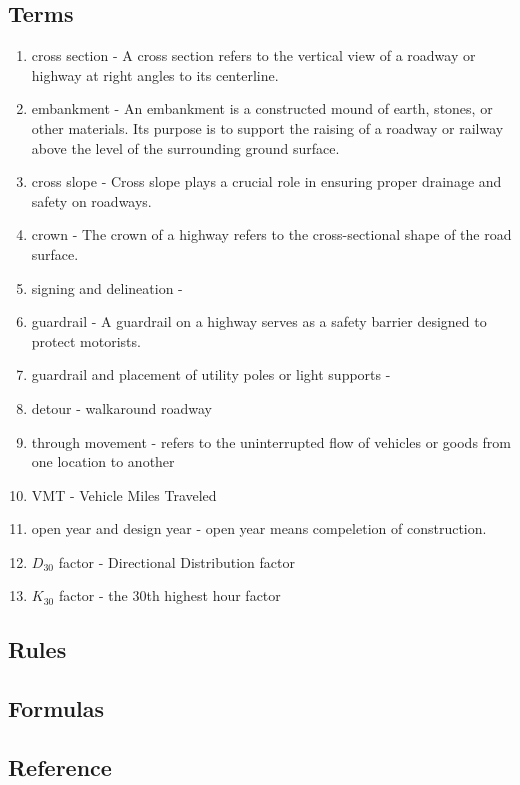 \documentclass{article}
\begin{document}
  \subsection{Terms}
  \begin{enumerate}
    \item cross section - A cross section refers to the vertical view of a roadway or highway at right angles to its centerline. 
    \item embankment - An embankment is a constructed mound of earth, stones, or other materials. Its purpose is to support the raising of a roadway or railway above the level of the surrounding ground surface.
    \item cross slope - Cross slope plays a crucial role in ensuring proper drainage and safety on roadways.
    \item crown - The crown of a highway refers to the cross-sectional shape of the road surface.
    \item signing and delineation -  
    \item guardrail - A guardrail on a highway serves as a safety barrier designed to protect motorists.
    \item guardrail and placement of utility poles or light supports - 
    \item  detour - walkaround roadway  
    \item through movement - refers to the uninterrupted flow of vehicles or goods from one location to another 
    \item VMT - Vehicle Miles Traveled
    \item open year and design year - open year means compeletion of construction. 
    \item $D_{30}$ factor - Directional Distribution factor 
    \item $K_{30}$ factor - the 30th highest hour factor 
  \end{enumerate}

  \subsection{Rules}

  \subsection{Formulas}

  \subsection{Reference}
\end{document}

